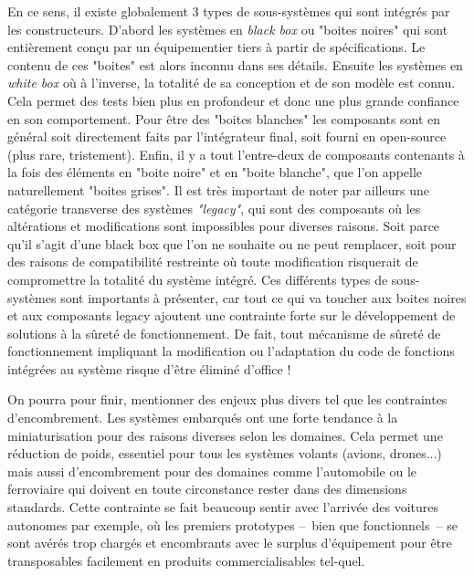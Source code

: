 \documentclass[french, a4paper, 11pt, twoside, pdftex]{StyleThese}
\begin{document}
	En ce sens, il existe globalement 3 types de sous-systèmes qui sont intégrés par les constructeurs. 
	D'abord les systèmes en \textit{black box} ou "boites noires" qui sont entièrement conçu par un équipementier tiers à partir de spécifications. Le contenu de ces "boites" est alors inconnu dans ses détails.
	Ensuite les systèmes en \textit{white box} où à l'inverse, la totalité de sa conception et de son modèle est connu. Cela permet des tests bien plus en profondeur et donc une plus grande confiance en son comportement. Pour être des "boites blanches" les composants sont en général soit directement faits par l'intégrateur final, soit fourni en open-source (plus rare, tristement).
	Enfin, il y a tout l'entre-deux de composants contenants à la fois des éléments en "boite noire" et en "boite blanche", que l'on appelle naturellement "boites grises".
	Il est très important de noter par ailleurs une catégorie transverse des systèmes \textit{"legacy"}, qui sont des composants où les altérations et modifications sont impossibles pour diverses raisons. Soit parce qu'il s'agit d'une black box que l'on ne souhaite ou ne peut remplacer, soit pour des raisons de compatibilité restreinte où toute modification risquerait de compromettre la totalité du système intégré. 
	Ces différents types de sous-systèmes sont importants à présenter, car tout ce qui va toucher aux boites noires et aux composants legacy ajoutent une contrainte forte sur le développement de solutions à la sûreté de fonctionnement. De fait, tout mécanisme de sûreté de fonctionnement impliquant la modification ou l'adaptation du code de fonctions intégrées au système risque d'être éliminé d'office !
	
	On pourra pour finir, mentionner des enjeux plus divers tel que les contraintes d'encombrement. Les systèmes embarqués ont une forte tendance à la miniaturisation pour des raisons diverses selon les domaines. Cela permet une réduction de poids, essentiel pour tous les systèmes volants (avions, drones...) mais aussi d'encombrement pour des domaines comme l'automobile ou le ferroviaire qui doivent en toute circonstance rester dans des dimensions standards. Cette contrainte se fait beaucoup sentir avec l'arrivée des voitures autonomes par exemple, où les premiers prototypes --~bien que fonctionnels~-- se sont avérés trop chargés et encombrants avec le surplus d'équipement pour être transposables facilement en produits commercialisables tel-quel.
	
\end{document}
